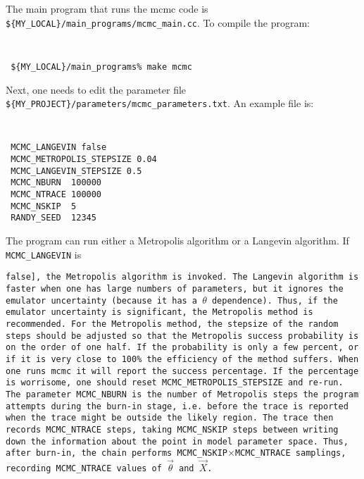 \documentclass[UserManual.tex]{subfiles}
\begin{document}
The main program that runs the mcmc code is {\tt\$\{MY\_LOCAL\}/main\_programs/mcmc\_main.cc}. To compile the program:
{\tt
\begin{verbatim}
 ${MY_LOCAL}/main_programs% make mcmc
\end{verbatim}}
Next, one needs to edit the parameter file {\tt\$\{MY\_PROJECT\}/parameters/mcmc\_parameters.txt}. An example file is:
{\tt
\begin{verbatim}
 MCMC_LANGEVIN false
 MCMC_METROPOLIS_STEPSIZE 0.04
 MCMC_LANGEVIN_STEPSIZE 0.5
 MCMC_NBURN  100000
 MCMC_NTRACE 100000
 MCMC_NSKIP  5
 RANDY_SEED  12345
\end{verbatim}}
The program can run either a Metropolis algorithm or a Langevin algorithm. If {\tt MCMC\_LANGEVIN} is {\tt false], the Metropolis algorithm is invoked. The Langevin algorithm is faster when one has large numbers of parameters, but it ignores the emulator uncertainty (because it has a $\theta$ dependence). Thus, if the emulator uncertainty is significant, the Metropolis method is recommended. For the Metropolis method, the stepsize of the random steps should be adjusted so that the Metropolis success probability is on the order of one half. If the probability is only a few percent, or if it is very close to 100\% the efficiency of the method suffers. When one runs {\tt mcmc} it will report the success percentage. If the percentage is worrisome, one should reset {\tt MCMC\_METROPOLIS\_STEPSIZE} and re-run. The parameter {\tt MCMC\_NBURN} is the number of Metropolis steps the program attempts during the burn-in stage, i.e. before the trace is reported when the trace might be outside the likely region. The trace then records {\tt MCMC\_NTRACE} steps, taking {\tt MCMC\_NSKIP} steps between writing down the information about the point in model parameter space. Thus, after burn-in, the chain performs {\tt MCMC\_NSKIP}$\times${\tt MCMC\_NTRACE} samplings, recording {\tt MCMC\_NTRACE} values of $\vec{\theta}$ and $\vec{X}$.

}
\end{document}
